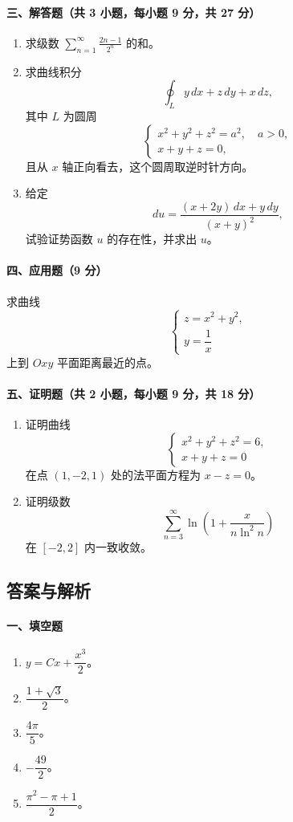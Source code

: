 \paragraph{三、解答题（共 3 小题，每小题 9 分，共 27 分）}
\begin{enumerate}
  \item 求级数 $\displaystyle \sum_{n=1}^\infty \frac{2n-1}{2^n}$ 的和。
  \item 求曲线积分
  \[
    \oint_L y\,dx+z\,dy+x\,dz,
  \]
  其中 $L$ 为圆周
  \[
    \begin{cases}
      x^2+y^2+z^2=a^2,\quad a>0,\\
      x+y+z=0,
    \end{cases}
  \]
  且从 $x$ 轴正向看去，这个圆周取逆时针方向。
  \item 给定
  \[
    du=\frac{(x+2y)\,dx+y\,dy}{(x+y)^2},
  \]
  试验证势函数 $u$ 的存在性，并求出 $u$。
\end{enumerate}

\paragraph{四、应用题（9 分）}
求曲线
\[
  \begin{cases}
    z=x^2+y^2,\\
    y=\dfrac1x
  \end{cases}
\]
上到 $Oxy$ 平面距离最近的点。

\paragraph{五、证明题（共 2 小题，每小题 9 分，共 18 分）}
\begin{enumerate}
  \item 证明曲线
  \[
    \begin{cases}
      x^2+y^2+z^2=6,\\
      x+y+z=0
    \end{cases}
  \]
  在点 $(1,-2,1)$ 处的法平面方程为 $x-z=0$。
  \item 证明级数
  \[
    \sum_{n=3}^\infty \ln\left(1+\frac{x}{n\ln^2 n}\right)
  \]
  在 $[-2,2]$ 内一致收敛。
\end{enumerate}

\subsection{答案与解析}

\paragraph{一、填空题}
\begin{enumerate}
  \item $y=Cx+\dfrac{x^3}{2}$。
  \item $\dfrac{1+\sqrt3}{2}$。
  \item $\dfrac{4\pi}{5}$。
  \item $-\dfrac{49}{2}$。
  \item $\dfrac{\pi^2-\pi+1}{2}$。
\end{enumerate}

